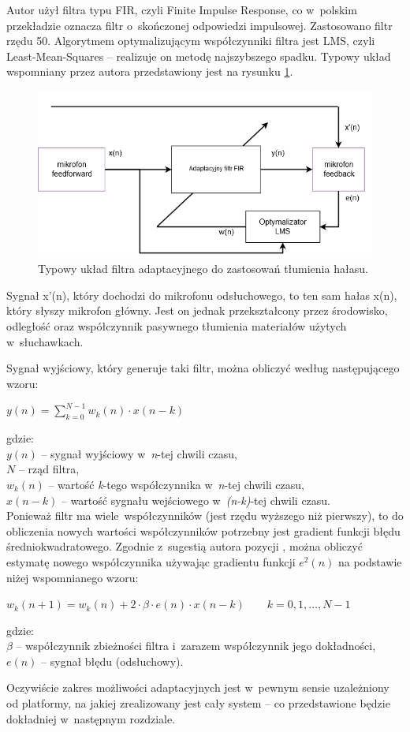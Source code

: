 Autor użył filtra typu FIR, czyli Finite Impulse Response, co w~polskim przekładzie oznacza filtr o~skończonej odpowiedzi impulsowej. Zastosowano filtr rzędu 50. Algorytmem optymalizującym współczynniki filtra jest LMS, czyli Least-Mean-Squares -- realizuje on metodę najszybszego spadku. Typowy układ wspomniany przez autora przedstawiony jest na rysunku \ref{fig:typical_fir_lms}.
\begin{figure}[h!]
	\centering
	\includegraphics[width=\linewidth]{../Assets/typical_fir_lms.png}
	\caption{Typowy układ filtra adaptacyjnego do zastosowań tłumienia hałasu.}
	\label{fig:typical_fir_lms}
\end{figure}

Sygnał x'(n), który dochodzi do mikrofonu odsłuchowego, to ten sam hałas x(n), który słyszy mikrofon główny. Jest on jednak przekształcony przez środowisko, odległość oraz współczynnik pasywnego tłumienia materiałów użytych w~słuchawkach.

Sygnał wyjściowy, który generuje taki filtr, można obliczyć według następującego wzoru:\\
\begin{center} $ y(n) = \sum_{k=0}^{N-1} w_k(n)\cdot x(n-k) $ \end{center}
gdzie:\\
$y(n)$ -- sygnał wyjściowy w~\textit{n}-tej chwili czasu,\\
$N$ -- rząd filtra,\\
$w_k(n)$ -- wartość \textit{k}-tego współczynnika w~\textit{n}-tej chwili czasu,\\
$x(n-k)$ -- wartość sygnału wejściowego w~\textit{(n-k)}-tej chwili czasu.\\
Ponieważ filtr ma wiele~współczynników (jest rzędu wyższego niż pierwszy), to do obliczenia nowych wartości współczynników potrzebny jest gradient funkcji błędu średniokwadratowego. Zgodnie z~sugestią autora pozycji \cite{Chassaing}, można obliczyć estymatę nowego współczynnika używając gradientu funkcji $e^2(n)$ na podstawie niżej wspomnianego wzoru:\\
\begin{center} $ w_k(n+1) = w_k(n) + 2\cdot\beta\cdot e(n)\cdot x(n-k) \qquad k=0,1,\dots,N-1 $ \end{center}
gdzie:\\
$\beta$ -- współczynnik zbieżności filtra i~zarazem współczynnik jego dokładności,\\
$e(n)$ -- sygnał błędu (odsłuchowy).

Oczywiście zakres możliwości adaptacyjnych jest w~pewnym sensie uzależniony od platformy, na jakiej zrealizowany jest cały system -- co przedstawione będzie dokładniej w~następnym rozdziale.